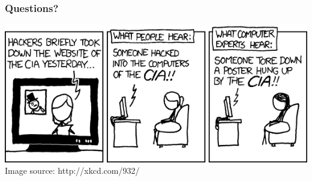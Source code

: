 \documentclass{beamer}
\begin{document}

\begin{frame}
	\frametitle{Questions?}
	\includegraphics[width=1\textwidth]{images/cia.png}
	\newline
	{\footnotesize Image source: http://xkcd.com/932/}
\end{frame}
\end{document}
